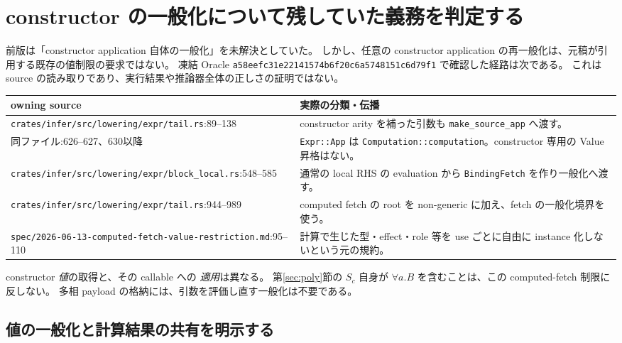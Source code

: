 \documentclass[11pt,a4paper]{article}
\begin{document}
\section{constructor の一般化について残していた義務を判定する}
\label{sec:value-restriction}

前版は「constructor application 自体の一般化」を未解決としていた。
しかし、任意の constructor application の再一般化は、元稿が引用する既存の値制限の要求ではない。
凍結 Oracle \texttt{a58eefc31e22141574b6f20c6a5748151c6d79f1} で確認した経路は次である。
これは source の読み取りであり、実行結果や推論器全体の正しさの証明ではない。

\begin{longtable}{>{\raggedright\arraybackslash}p{}>{\raggedright\arraybackslash}p{}}
\toprule owning source & 実際の分類・伝播 \\
\midrule\endhead
\nolinkurl{crates/infer/src/lowering/expr/tail.rs}:89--138 &
constructor arity を補った引数も \texttt{make\_source\_app} へ渡す。\\
同ファイル:626--627、630以降 &
\texttt{Expr::App} は \texttt{Computation::computation}。constructor 専用の Value 昇格はない。\\
\nolinkurl{crates/infer/src/lowering/expr/block_local.rs}:548--585 &
通常の local RHS の evaluation から \texttt{BindingFetch} を作り一般化へ渡す。\\
\nolinkurl{crates/infer/src/lowering/expr/tail.rs}:944--989 &
computed fetch の root を non-generic に加え、fetch の一般化境界を使う。\\
\nolinkurl{spec/2026-06-13-computed-fetch-value-restriction.md}:95--110 &
計算で生じた型・effect・role 等を use ごとに自由に instance 化しないという元の規約。\\
\bottomrule
\end{longtable}

constructor \emph{値}の取得と、その callable への \emph{適用}は異なる。
第\ref{sec:poly}節の \(S_c\) 自身が \(\forall a.B\) を含むことは、この computed-fetch 制限に反しない。
多相 payload の格納には、引数を評価し直す一般化は不要である。

\subsection{値の一般化と計算結果の共有を明示する}
\end{document}
